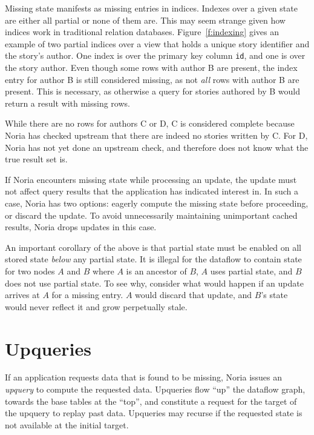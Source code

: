 Missing state manifests as missing entries in indices. Indexes over a given
state are either all partial or none of them are. This may seem strange given
how indices work in traditional relation databases. Figure~\vref{f:indexing}
gives an example of two partial indices over a view that holds a unique story
identifier and the story's author. One index is over the primary key column
\texttt{id}, and one is over the story author. Even though some rows with author
B are present, the index entry for author B is still considered missing, as not
\emph{all} rows with author B are present. This is necessary, as otherwise a
query for stories authored by B would return a result with missing rows.

While there are no rows for authors C or D, C is considered complete because
Noria has checked upstream that there are indeed no stories written by C. For D,
Noria has not yet done an upstream check, and therefore does not know what the
true result set is.

If Noria encounters missing state while processing an update, the update must
not affect query results that the application has indicated interest in. In such
a case, Noria has two options: eagerly compute the missing state before
proceeding, or discard the update. To avoid unnecessarily maintaining
unimportant cached results, Noria drops updates in this case.

An important corollary of the above is that partial state must be enabled
on all stored state \emph{below} any partial state. It is illegal for the
dataflow to contain state for two nodes $A$ and $B$ where $A$ is an ancestor of
$B$, $A$ uses partial state, and $B$ does not use partial state. To see why,
consider what would happen if an update arrives at $A$ for a missing entry. $A$
would discard that update, and $B$'s state would never reflect it and grow
perpetually stale.

\section{Upqueries}
\label{s:upqueries}

If an application requests data that is found to be missing, Noria issues an
\textit{upquery} to compute the requested data. Upqueries flow ``up'' the
dataflow graph, towards the base tables at the ``top'', and constitute a request
for the target of the upquery to replay past data. Upqueries may recurse if the
requested state is not available at the initial target.


